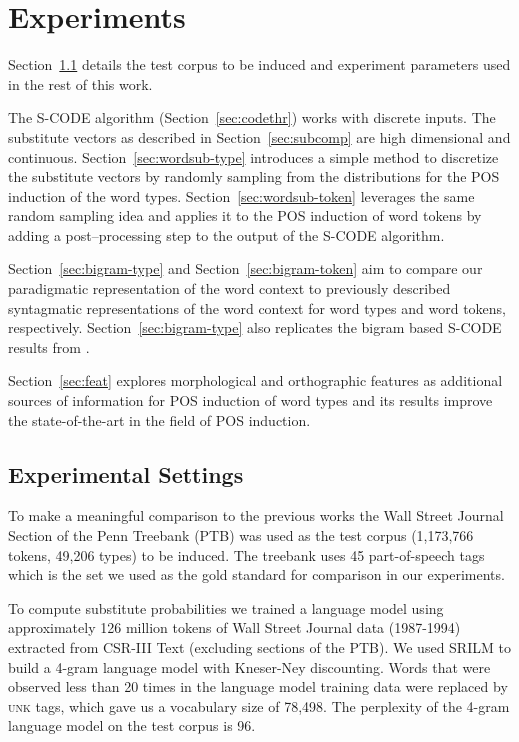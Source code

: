 \section{Experiments}
\label{sec:exp}

Section~\ref{sec:expset} details the test corpus to be induced and
experiment parameters used in the rest of this work.

The S-CODE algorithm (Section~\ref{sec:codethr}) works with discrete
inputs.  The substitute vectors as described in
Section~\ref{sec:subcomp} are high dimensional and continuous.
Section~\ref{sec:wordsub-type} introduces a simple method to
discretize the substitute vectors by randomly sampling from the
distributions for the POS induction of the word types.
Section~\ref{sec:wordsub-token} leverages the same random sampling
idea and applies it to the POS induction of word tokens by adding a
post--processing step to the output of the S-CODE algorithm.

Section~\ref{sec:bigram-type} and Section~\ref{sec:bigram-token} aim
to compare our paradigmatic representation of the word context to
previously described syntagmatic representations of the word context
for word types and word tokens, respectively.
Section~\ref{sec:bigram-type} also replicates the bigram based S-CODE
results from \cite{maron2010sphere}.

Section~\ref{sec:feat} explores morphological and orthographic
features as additional sources of information for POS induction of
word types and its results improve the state-of-the-art in the field
of POS induction.

\subsection{Experimental Settings}\label{sec:expset}

To make a meaningful comparison to the previous works
the Wall Street Journal Section of the Penn Treebank (PTB) \cite{treebank3}
was used as the test corpus (1,173,766 tokens, 49,206 types) to be
induced.
The treebank uses 45 part-of-speech tags which is the set we used as
the gold standard for comparison in our experiments.

To compute substitute probabilities we trained a language model using
approximately 126 million tokens of Wall Street Journal data
(1987-1994) extracted from CSR-III Text \cite{csr3text} (excluding
sections of the PTB).
We used SRILM \cite{Stolcke2002} to build a 4-gram language model with
Kneser-Ney discounting.
Words that were observed less than 20 times in the language model
training data were replaced by \textsc{unk} tags, which gave us a
vocabulary size of 78,498.
The perplexity of the 4-gram language model on the test corpus is 96.

